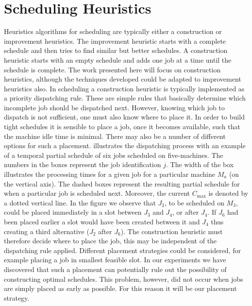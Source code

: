 \documentclass[smallextended]{svjour3}
\begin{document}
\section{Scheduling Heuristics} \label{sec:constructionjssp}
Heuristics algorithms for scheduling are typically either a construction or 
improvement heuristics. The improvement heuristic starts with a complete 
schedule and then tries to find similar but better schedules.  A construction 
heuristic starts with an empty schedule and adds one job at a time until the 
schedule is complete. The work presented here will focus on construction 
heuristics, although the techniques developed could be adapted to improvement
heuristics also. In scheduling a construction heuristic is typically 
implemented as a priority dispatching rule. These are simple rules that 
basically determine which incomplete job should be dispatched next. However, 
knowing which job to dispatch is not sufficient, one must also know where to 
place it. In order to build tight schedules it is sensible to place a job, once 
it becomes available, such that the machine idle time is minimal. There may 
also be a number of different options for such a placement. 
 illustrates the dispatching process with an example of 
a temporal partial schedule of six jobs scheduled on five-machines. The numbers 
in the boxes represent the job identification $j$. The width of the box 
illustrates the processing times for a given job for a particular machine $M_a$ 
(on the vertical axis). The dashed boxes represent the resulting partial 
schedule for when a particular job is scheduled next. Moreover, the current 
$C_{\max}$ is denoted by a dotted vertical line. In the figure we observe that 
$J_2$, to be scheduled on $M_3$, could be placed immediately in a slot between 
$J_3$ and $J_4$, or after $J_4$. If $J_6$ had been placed earlier a slot would
have been created between it and $J_4$ thus creating a third alternative ($J_2$ 
after $J_6$). The construction heuristic must therefore decide where to place 
the job, this may be independent of the dispatching rule applied. Different 
placement strategies could be considered, for example placing a job in smallest 
feasible slot. In our experiments we have discovered that such a placement can
potentially rule out the possibility of constructing optimal schedules. This 
problem, however, did not occur when jobs are simply placed as early as 
possible. For this reason it will be our placement strategy.
\end{document}
